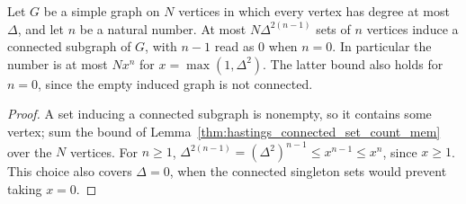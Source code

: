 \begin{lemma}
    \label{thm:hastings_connected_set_count}
    \leanok
    Let $G$ be a simple graph on $N$ vertices in which every vertex has degree
    at most $\Delta$, and let $n$ be a natural number. At most
    $N\Delta^{2(n-1)}$ sets of $n$ vertices induce a connected subgraph of $G$,
    with $n-1$ read as $0$ when $n=0$.
    In particular the number is at most $Nx^n$ for
    $x=\max(1,\Delta^2)$. The latter bound also holds for $n=0$, since the
    empty induced graph is not connected.
\end{lemma}

\begin{proof}
    \leanok
    A set inducing a connected subgraph is nonempty, so it contains some
    vertex; sum the bound of Lemma~\ref{thm:hastings_connected_set_count_mem}
    over the $N$ vertices.
    For $n\ge1$, $\Delta^{2(n-1)}=(\Delta^2)^{n-1}\le x^{n-1}\le x^n$,
    since $x\ge1$. This choice also covers $\Delta=0$, when the connected
    singleton sets would prevent taking $x=0$.
\end{proof}
